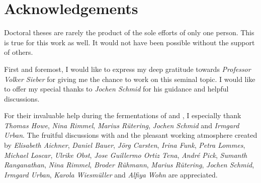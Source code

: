 { \renewcommand{\leftmark}{ACKNOWLEDGEMENTS}
\section*{Acknowledgements}
%
%
%
%
Doctoral theses are rarely the product of the sole efforts of only one person. This is true for this work as well. It would not have been possible without the support of others.

First and foremost, I would like to express my deep gratitude towards \textit{Professor Volker Sieber} for giving me the chance to work on this seminal topic. I would like to offer my special thanks to \textit{Jochen Schmid} for his guidance and helpful discussions.

For their invaluable help during the fermentations of \rolf{} and \comm{}, I especially thank \textit{Thomas Howe}, \textit{Nina Rimmel}, \textit{Marius Rütering}, \textit{Jochen Schmid} and \textit{Irmgard Urban}. The fruitful discussions with and the pleasant working atmosphere created by 
\textit{Elisabeth Aichner}, 
\textit{Daniel Bauer}, 
\textit{Jörg Carsten}, 
\textit{Irina Funk}, 
\textit{Petra Lommes}, 
\textit{Michael Loscar}, 
\textit{Ulrike Obst}, 
\textit{Jose Guillermo Ortiz Tena}, 
\textit{André Pick}, 
\textit{Sumanth Ranganathan}, 
\textit{Nina Rimmel}, 
\textit{Broder Rühmann}, 
\textit{Marius Rütering}, 
\textit{Jochen Schmid}, 
\textit{Irmgard Urban}, 
\textit{Karola Wiesmüller} and
\textit{Alfiya Wohn}
are appreciated. 

}
